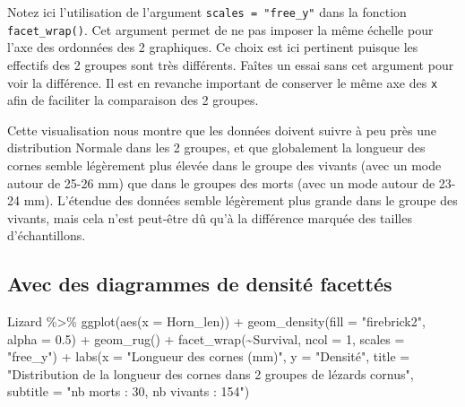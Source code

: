 \documentclass[
  a4paper,
  DIV=11,
  numbers=noendperiod,
  oneside]{scrreprt}
\newenvironment{Shaded}{}{}
\newcommand{\AttributeTok}[1]{\textcolor[rgb]{0.84,0.23,0.29}{#1}}
\newcommand{\DecValTok}[1]{\textcolor[rgb]{0.00,0.36,0.77}{#1}}
\newcommand{\FloatTok}[1]{\textcolor[rgb]{0.00,0.36,0.77}{#1}}
\newcommand{\FunctionTok}[1]{\textcolor[rgb]{0.44,0.26,0.76}{#1}}
\newcommand{\NormalTok}[1]{\textcolor[rgb]{0.14,0.16,0.18}{#1}}
\newcommand{\SpecialCharTok}[1]{\textcolor[rgb]{0.00,0.36,0.77}{#1}}
\newcommand{\StringTok}[1]{\textcolor[rgb]{0.01,0.18,0.38}{#1}}
\begin{document}
Notez ici l'utilisation de l'argument \texttt{scales\ =\ "free\_y"} dans
la fonction \texttt{facet\_wrap()}. Cet argument permet de ne pas
imposer la même échelle pour l'axe des ordonnées des 2 graphiques. Ce
choix est ici pertinent puisque les effectifs des 2 groupes sont très
différents. Faîtes un essai sans cet argument pour voir la différence.
Il est en revanche important de conserver le même axe des \texttt{x}
afin de faciliter la comparaison des 2 groupes.

Cette visualisation nous montre que les données doivent suivre à peu
près une distribution Normale dans les 2 groupes, et que globalement la
longueur des cornes semble légèrement plus élevée dans le groupe des
vivants (avec un mode autour de 25-26 mm) que dans le groupes des morts
(avec un mode autour de 23-24 mm). L'étendue des données semble
légèrement plus grande dans le groupe des vivants, mais cela n'est
peut-être dû qu'à la différence marquée des tailles d'échantillons.

\hypertarget{sec-densfacet}{%
\subsection{Avec des diagrammes de densité
facettés}\label{sec-densfacet}}

\begin{Shaded}
\begin{Highlighting}[]
\NormalTok{Lizard }\SpecialCharTok{\%\textgreater{}\%}
  \FunctionTok{ggplot}\NormalTok{(}\FunctionTok{aes}\NormalTok{(}\AttributeTok{x =}\NormalTok{ Horn\_len)) }\SpecialCharTok{+}
  \FunctionTok{geom\_density}\NormalTok{(}\AttributeTok{fill =} \StringTok{"firebrick2"}\NormalTok{, }\AttributeTok{alpha =} \FloatTok{0.5}\NormalTok{) }\SpecialCharTok{+}
  \FunctionTok{geom\_rug}\NormalTok{() }\SpecialCharTok{+}
  \FunctionTok{facet\_wrap}\NormalTok{(}\SpecialCharTok{\textasciitilde{}}\NormalTok{Survival, }\AttributeTok{ncol =} \DecValTok{1}\NormalTok{, }\AttributeTok{scales =} \StringTok{"free\_y"}\NormalTok{) }\SpecialCharTok{+}
  \FunctionTok{labs}\NormalTok{(}\AttributeTok{x =} \StringTok{"Longueur des cornes (mm)"}\NormalTok{,}
       \AttributeTok{y =} \StringTok{"Densité"}\NormalTok{,}
       \AttributeTok{title =} \StringTok{"Distribution de la longueur des cornes dans 2 groupes de lézards cornus"}\NormalTok{,}
       \AttributeTok{subtitle =} \StringTok{"nb morts : 30, nb vivants : 154"}\NormalTok{)}
\end{Highlighting}
\end{Shaded}
\end{document}

